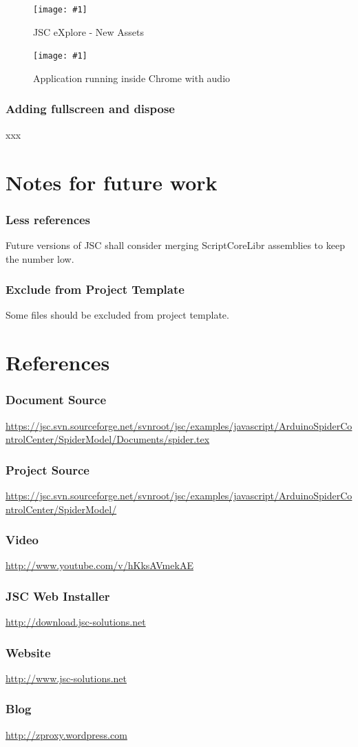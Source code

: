 \documentclass[12pt,leqno]{book}
\newcommand{\png}[1]{\texttt{[image: \#1]}}
\newcommand{\figpng}[2]{\begin{figure}[htb]\centering\png{#1}\caption{#2}\end{figure}}
\begin{document}
\figpng{Images/eXplore-2012-03-31_13.48.45}
{JSC eXplore - New Assets}

\figpng{Images/A_string_from_JavaScript._-_Google_Chrome-2012-03-31_13.54.10}
{Application running inside Chrome with audio}


\subsection{Adding fullscreen and dispose}
xxx




\chapter{Notes for future work}

\subsection{Less references}
Future versions of JSC shall consider merging ScriptCoreLibr assemblies to keep the number low.

\subsection{Exclude from Project Template}
Some files should be excluded from project template. 

\chapter{References}

\subsection{Document Source}

\url{https://jsc.svn.sourceforge.net/svnroot/jsc/examples/javascript/ArduinoSpiderControlCenter/SpiderModel/Documents/spider.tex}

\subsection{Project Source}
\url{https://jsc.svn.sourceforge.net/svnroot/jsc/examples/javascript/ArduinoSpiderControlCenter/SpiderModel/}



\subsection{Video}
\url{http://www.youtube.com/v/hKksAVmekAE}

\subsection{JSC Web Installer}
\url{http://download.jsc-solutions.net}

\subsection{Website}
\url{http://www.jsc-solutions.net}

\subsection{Blog}
\url{http://zproxy.wordpress.com}
\end{document}
